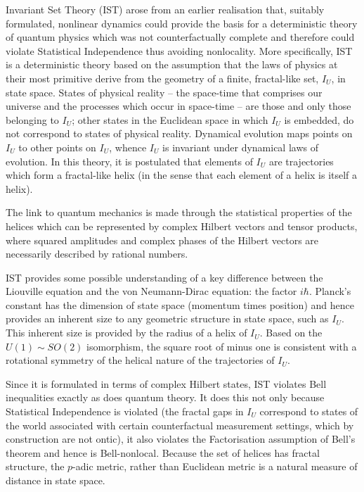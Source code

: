 \documentclass[12pt]{article}
\begin{document}
Invariant Set Theory (IST) \cite{Palmer:2009mxd, Palmer:2018mxd} arose from an earlier realisation \cite{Palmer:1995mxd} that, suitably formulated, nonlinear dynamics could provide the basis for a deterministic theory of quantum physics which was not counterfactually complete and therefore could violate Statistical Independence thus avoiding nonlocality. More specifically, IST is a deterministic theory based on the assumption that the laws of physics at their most primitive derive from the geometry of a finite, fractal-like set, $I_U$, in state space. States of physical reality -- the space-time that comprises our universe and the processes which occur in space-time -- are those and only those belonging to $I_U$; other states in the Euclidean space in which $I_U$ is  embedded, do not correspond to states of physical reality. Dynamical evolution maps points on $I_U$ to other points on $I_U$, whence $I_U$ is invariant under dynamical laws of evolution. In this theory, it is postulated that elements of $I_U$ are trajectories which form a fractal-like helix (in the sense that each element of a helix is itself a helix). 

The link to quantum mechanics is made through the statistical properties of the helices which can be represented by complex Hilbert vectors and tensor products, where squared amplitudes and complex phases of the Hilbert vectors are necessarily described by rational numbers. 

IST provides some possible understanding of a key difference between the Liouville equation and the von Neumann-Dirac equation: the factor $i \hbar$. Planck's constant has the dimension of state space (momentum times position) and hence provides an inherent size to any geometric structure in state space, such as $I_U$. This inherent size is provided by the radius of a helix of $I_U$. Based on the $U(1) \sim SO(2)$ isomorphism, the square root of minus one is consistent with a rotational symmetry of the helical nature of the trajectories of $I_U$. 

Since it is formulated in terms of complex Hilbert states, IST violates Bell inequalities exactly as does quantum theory. It does this not only because Statistical Independence is violated (the fractal gaps in $I_U$ correspond to states of the world associated with certain counterfactual measurement settings, which by construction are not ontic), it also violates the Factorisation assumption of Bell's theorem and hence is Bell-nonlocal. Because the set of helices has fractal structure, the $p$-adic metric, rather than Euclidean metric is a natural measure of distance in state space.  
 
\end{document}
